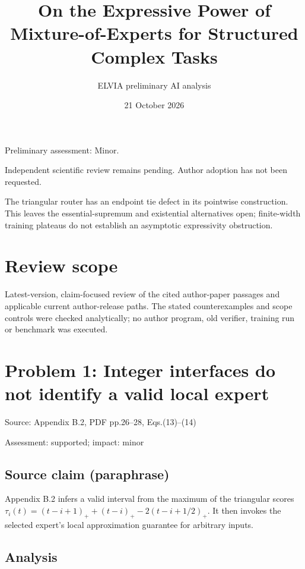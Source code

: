 \documentclass[11pt]{article}
\begin{document}
\title{On the Expressive Power of Mixture-of-Experts for Structured Complex Tasks}

\author{ELVIA preliminary AI analysis}\date{21 October 2026}\maketitle

Preliminary assessment: Minor.\par

Independent scientific review remains pending. Author adoption has not been requested.

The triangular router has an endpoint tie defect in its pointwise construction. This leaves the essential-supremum and existential alternatives open; finite-width training plateaus do not establish an asymptotic expressivity obstruction.

\section*{Review scope}

Latest-version, claim-focused review of the cited author-paper passages and applicable current author-release paths. The stated counterexamples and scope controls were checked analytically; no author program, old verifier, training run or benchmark was executed.

\section*{Problem 1: Integer interfaces do not identify a valid local expert}

Source: Appendix B.2, PDF pp.26–28, Eqs.(13)–(14)

Assessment: supported; impact: minor

\subsection*{Source claim (paraphrase)}

Appendix B.2 infers a valid interval from the maximum of the triangular scores \(\tau_i(t)=(t-i+1)_++(t-i)_+-2(t-i+1/2)_+\). It then invokes the selected expert’s local approximation guarantee for arbitrary inputs.

\subsection*{Analysis}
\end{document}
